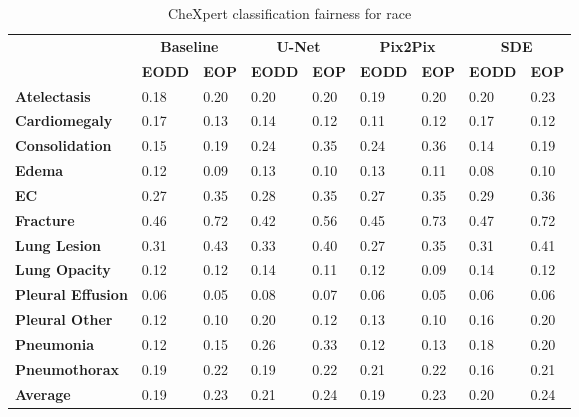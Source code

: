     
    \begin{table}[]
        \centering
        \caption{CheXpert classification fairness for race}\label{tab:chex_race}
        \begin{tabular}{l|llllllll}
        \hline
        \multirow{2}{*}{\textbf{}} & \multicolumn{2}{c|}{\textbf{Baseline}}                   & \multicolumn{2}{c|}{\textbf{U-Net}}                              & \multicolumn{2}{c|}{\textbf{Pix2Pix}}                              & \multicolumn{2}{c}{\textbf{SDE}}    \\ \cline{2-9}
                                                                                           & \textbf{EODD} & \textbf{EOP}  & \textbf{EODD} & \textbf{EOP}  & \textbf{EODD} & \textbf{EOP} & \textbf{EODD} & \textbf{EOP} \\ \hline
        \textbf{Atelectasis}  & 0.18 & 0.20 & 0.20 & 0.20 & 0.19 & 0.20 & 0.20 & 0.23 \\        
        \textbf{Cardiomegaly} & 0.17 & 0.13 & 0.14 & 0.12 & 0.11 & 0.12 & 0.17 & 0.12 \\
        \textbf{Consolidation} & 0.15 & 0.19 & 0.24 & 0.35 & 0.24 & 0.36 & 0.14 & 0.19 \\
        \textbf{Edema} & 0.12 & 0.09 & 0.13 & 0.10 & 0.13 & 0.11 & 0.08 & 0.10 \\
        \textbf{EC} & 0.27 & 0.35 & 0.28 & 0.35 & 0.27 & 0.35 & 0.29 & 0.36 \\
        \textbf{Fracture} & 0.46 & 0.72 & 0.42 & 0.56 & 0.45 & 0.73 & 0.47 & 0.72 \\
        \textbf{Lung Lesion} & 0.31 & 0.43 & 0.33 & 0.40 & 0.27 & 0.35 & 0.31 & 0.41 \\
        \textbf{Lung Opacity} & 0.12 & 0.12 & 0.14 & 0.11 & 0.12 & 0.09 & 0.14 & 0.12 \\
        \textbf{Pleural Effusion} & 0.06 & 0.05 & 0.08 & 0.07 & 0.06 & 0.05 & 0.06 & 0.06 \\
        \textbf{Pleural Other} & 0.12 & 0.10 & 0.20 & 0.12 & 0.13 & 0.10 & 0.16 & 0.20 \\
        \textbf{Pneumonia} & 0.12 & 0.15 & 0.26 & 0.33 & 0.12 & 0.13 & 0.18 & 0.20 \\
        \textbf{Pneumothorax} & 0.19 & 0.22 & 0.19 & 0.22 & 0.21 & 0.22 & 0.16 & 0.21 \\
        \textbf{Average} & 0.19 & 0.23 & 0.21 & 0.24 & 0.19 & 0.23 & 0.20 & 0.24 \\ \hline
        \end{tabular}
        \end{table}